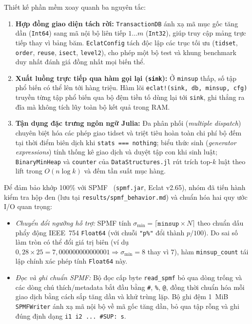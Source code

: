Thiết kế phần mềm xoay quanh ba nguyên tắc:
\begin{enumerate}
    \item \textbf{Hợp đồng giao diện tách rời:} \texttt{TransactionDB} ánh xạ mã mục gốc tăng dần (\texttt{Int64}) sang mã nội bộ liên tiếp $1 \ldots m$ (\texttt{Int32}), giúp truy cập mảng trực tiếp thay vì bảng băm. \texttt{EclatConfig} tách độc lập các trục tối ưu (\texttt{tidset}, \texttt{order}, \texttt{reuse}, \texttt{isect}, \texttt{level2}), cho phép một bộ test và khung benchmark duy nhất đánh giá đồng nhất mọi biến thể.
    \item \textbf{Xuất luồng trực tiếp qua hàm gọi lại (\texttt{sink}):} Ở \texttt{minsup} thấp, số tập phổ biến có thể lên tới hàng triệu. Hàm lõi \texttt{eclat!(sink, db, minsup, cfg)} truyền từng tập phổ biến qua bộ đệm tiền tố dùng lại tới \texttt{sink}, ghi thẳng ra đĩa mà không tích lũy toàn bộ kết quả trong RAM.
    \item \textbf{Tận dụng đặc trưng ngôn ngữ Julia:} Đa phân phối (\emph{multiple dispatch}) chuyên biệt hóa các phép giao tidset và triệt tiêu hoàn toàn chi phí bộ đếm tại thời điểm biên dịch khi \texttt{stats === nothing}; biểu thức sinh (\emph{generator expressions}) tính thống kê giao dịch và duyệt tập con khi sinh luật; \texttt{BinaryMinHeap} và \texttt{counter} của \texttt{DataStructures.jl} rút trích top-$k$ luật theo lift trong $O(n \log k)$ và đếm tần suất mục hàng.
\end{enumerate}

Để đảm bảo khớp 100\% với SPMF~\cite{fournier2014spmf} (\texttt{spmf.jar}, Eclat v2.65), nhóm đã tiến hành kiểm tra hộp đen (lưu tại \texttt{results/spmf\_behavior.md}) và chuẩn hóa hai quy ước I/O quan trọng:
\begin{itemize}
    \item \emph{Chuyển đổi ngưỡng hỗ trợ:} SPMF tính $\sigma_{\min} = \lceil \texttt{minsup} \times N \rceil$ theo chuẩn dấu phẩy động IEEE~754 \texttt{Float64} (với chuỗi \texttt{"p\%"} đổi thành $p/100$). Do sai số làm tròn có thể đổi giá trị biên (ví dụ $0{,}28 \times 25 = 7{,}000000000000001 \Rightarrow \sigma_{\min} = 8$ thay vì $7$), hàm \texttt{minsup\_count} tái lập chính xác phép tính \texttt{Float64} này.
    \item \emph{Đọc và ghi chuẩn SPMF:} Bộ đọc cấp byte \texttt{read\_spmf} bỏ qua dòng trống và các dòng chú thích/metadata bắt đầu bằng \texttt{\#}, \texttt{\%}, \texttt{@}, đồng thời chuẩn hóa mỗi giao dịch bằng cách sắp tăng dần và khử trùng lặp. Bộ ghi đệm 1~MiB \texttt{SPMFWriter} ánh xạ mã nội bộ về mã gốc tăng dần, bỏ qua tập rỗng và ghi đúng định dạng \texttt{i1 i2 ... \#SUP: s}.
\end{itemize}

